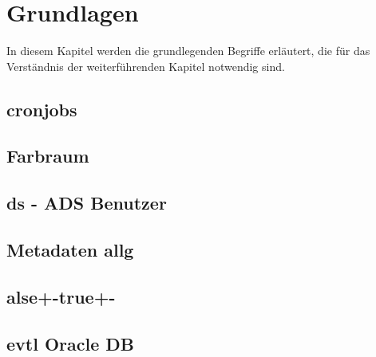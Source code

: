 \section{Grundlagen}
In diesem Kapitel werden die grundlegenden Begriffe erläutert, die für das Verständnis der weiterführenden Kapitel notwendig sind.





\subsection{cronjobs}

\subsection{Farbraum}
\subsection{ds - ADS Benutzer}
\subsection{Metadaten allg}
\subsection{alse+-true+-}
\subsection{evtl Oracle DB}







